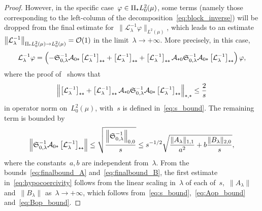\documentclass[10pt]{article}
\newcommand{\cL}{\mathcal{L}}
\newcommand{\cLham}{\mathcal A}
\newcommand{\wLmu}{L^2(\mu)}
\newcommand{\wLmuz}{L^2_0(\mu)}
\newcommand{\subplus}{\textnormal{\texttt{+}}}
\newcommand{\1}{\mathbbm 1}
\newcommand{\bigo}{\mathcal{O}}
\begin{document}
\begin{proof}
    However, in the specific case~$\varphi\in \Pi_{\subplus} L_0^2(\mu)$, some terms (namely those corresponding to the left-column of the decomposition~\eqref{eq:block_inverse}) will be dropped from the final estimate for~$\|\cL_\lambda^{-1}\varphi\|_{\wLmu}$, which leads to an estimate~$\left\|\cL_\lambda^{-1}\right\|_{\Pi_{\subplus}\wLmuz\to\wLmuz} = \bigo(1)$ in the limit~$\lambda\to +\infty$.
    More precisely, in this case,
    \begin{equation}
        \cL_\lambda^{-1}\varphi = \left(-\mathfrak{S}_{0,\lambda}^{-1}\cLham_{0\subplus}\left[\cL_\lambda^{-1}\right]_{\subplus\subplus}+\left[\cL_\lambda^{-1}\right]_{\subplus\subplus}+\left[\cL_\lambda^{-1}\right]_{\subplus\subplus}\cLham_{\subplus 0}\mathfrak{S}_{0,\lambda}^{-1}\cLham_{0\subplus}\left[\cL_\lambda^{-1}\right]_{\subplus\subplus}\right)\varphi,
    \end{equation}
    where the proof of~\cite[Theorem 2.7]{BFLS22} shows that
    \begin{equation}
        \label{eq:finalbound_A}
        \left\|\left[\cL_\lambda^{-1}\right]_{\subplus\subplus}+\left[\cL_\lambda^{-1}\right]_{\subplus\subplus}\cLham_{\subplus 0}\mathfrak{S}_{0,\lambda}^{-1}\cLham_{0\subplus}\left[\cL_\lambda^{-1}\right]_{\subplus\subplus}\right\|_{\subplus,\subplus}\leq \frac{2}{s}
    \end{equation}
    in operator norm on~$\wLmuz$, with~$s$ is defined in~\eqref{eq:s_bound}. The remaining term is bounded by
    \begin{equation}
        \label{eq:finalbound_B}
        \left\|\mathfrak{S}_{0,\lambda}^{-1}\cLham_{0\subplus}\left[\cL_\lambda^{-1}\right]_{\subplus\subplus}\right\|\leq \sqrt{\frac{\left\|\mathfrak{S}_{0,\lambda}^{-1}\right\|_{0,0}}{s}}\leq s^{-1/2}\sqrt{\frac{\|A_\lambda\|_{1,1}}{a^2}+b\frac{\|B_\lambda\|_{2,0}}{s}},
    \end{equation}
    where the constants~$a,b$ are independent from~$\lambda$. From the bounds~\eqref{eq:finalbound_A} and~\eqref{eq:finalbound_B}, the first estimate in~\eqref{eq:hypocoercivity} follows from the linear scaling in~$\lambda$ of each of~$s$,~$\|A_\lambda\|$ and~$\|B_\lambda\|$ as~$\lambda\to +\infty$, which follows from~\eqref{eq:s_bound},~\eqref{eq:Aop_bound} and~\eqref{eq:Bop_bound}.


\end{proof}
\end{document}
